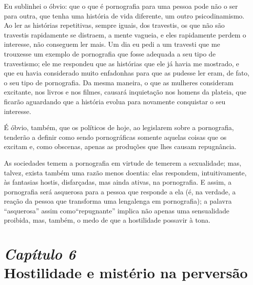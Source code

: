 Eu sublinhei o óbvio: que o que é pornografia para uma pessoa pode
não o ser para outra, que tenha uma história de vida diferente, um
outro psicodinamismo. Ao ler as histórias repetitivas, sempre iguais,
dos travestis, os que não são travestis rapidamente se distraem, a
mente vagueia, e eles rapidamente perdem o interesse, não conseguem ler
mais. Um dia eu pedi a um travesti que me trouxesse um exemplo de
pornografia que fosse adequada a seu tipo de travestismo; ele me
respondeu que as histórias que ele já havia me mostrado, e que eu havia
considerado muito enfadonhas para que as pudesse ler eram, de fato, o
seu tipo de pornografia. Da mesma maneira, o que as mulheres consideram
excitante, nos livros e nos filmes, causará inquietação nos homens da
plateia, que ficarão aguardando que a história evolua para novamente
conquistar o seu interesse.\idxpornomulh[|)]

É óbvio, também, que os políticos de hoje, ao legislarem sobre a
pornografia, tenderão a definir como sendo pornográficas somente
aquelas coisas que os excitam e, como obscenas, apenas as produções que
lhes causam repugnância.

As sociedades temem a pornografia em virtude de temerem a
sexualidade; mas, talvez, exista também uma razão menos doentia: elas
respondem, intuitivamente,\idxpornohost{} às fantasias hostis,\idxhostporn{} disfarçadas, mas ainda
ativas, na pornografia. E assim, a pornografia será asquerosa para a
pessoa que responde a ela (é, na verdade, a reação da pessoa que
transforma uma lengalenga em pornografia); a palavra
``asquerosa'' assim como\idxfantamulh[|)]
``repugnante'' implica não apenas uma
sensualidade proibida, mas, também, o medo de que a hostilidade possa\idxporno[|)]
vir à tona.



\chapter[\textbf{6}\quad Hostilidade e mistério na perversão]{{\large\textit{Capítulo 6}}\\ Hostilidade e mistério na perversão}


